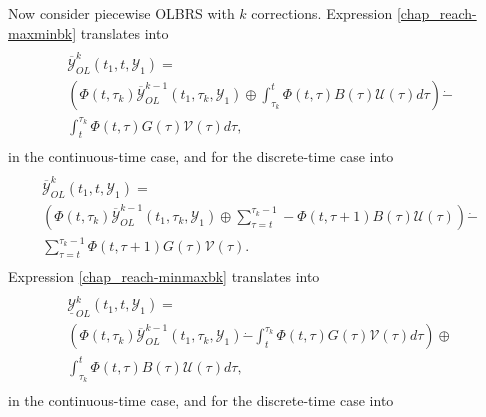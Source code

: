 \documentclass[letterpaper,10pt,english]{sphinxmanual}
\begin{document}
Now consider piecewise OLBRS with $k$ corrections. Expression
\eqref{chap_reach-maxminbk} translates into
\label{chap_reach:equation-ctlsmaxminbk}\begin{gather}
\begin{split}\begin{array}{l}
\overline{{\mathcal Y}}_{OL}^k(t_1, t, {\mathcal Y}_1) = \\
\left(\Phi(t, \tau_k)\overline{{\mathcal Y}}_{OL}^{k-1}(t_1, \tau_k, {\mathcal Y}_1) \oplus
\int_{\tau_k}^t\Phi(t, \tau)B(\tau){\mathcal U}(\tau)d\tau\right) \dot{-} \\
\int^{\tau_k}_t\Phi(t, \tau)G(\tau){\mathcal V}(\tau)d\tau,
\end{array}\end{split}\label{chap_reach-ctlsmaxminbk}
\end{gather}
in the continuous-time case, and for the discrete-time case into
\label{chap_reach:equation-dtlsmaxminbk}\begin{gather}
\begin{split}\begin{array}{l}
\overline{{\mathcal Y}}_{OL}^k(t_1, t, {\mathcal Y}_1) = \\
\left(\Phi(t, \tau_k)\overline{{\mathcal Y}}_{OL}^{k-1}(t_1, \tau_k, {\mathcal Y}_1) \oplus
\sum_{\tau=t}^{\tau_k-1}-\Phi(t, \tau+1)B(\tau){\mathcal U}(\tau)\right) \dot{-} \\
\sum_{\tau=t}^{\tau_k-1}\Phi(t, \tau+1)G(\tau){\mathcal V}(\tau).
\end{array}\end{split}\label{chap_reach-dtlsmaxminbk}
\end{gather}
Expression \eqref{chap_reach-minmaxbk} translates into
\label{chap_reach:equation-ctlsminmaxbk}\begin{gather}
\begin{split}\begin{array}{l}
\underline{{\mathcal Y}}_{OL}^k(t_1, t, {\mathcal Y}_1) = \\
\left(\Phi(t, \tau_k)\overline{{\mathcal Y}}_{OL}^{k-1}(t_1, \tau_k, {\mathcal Y}_1) \dot{-}
\int^{\tau_k}_t\Phi(t, \tau)G(\tau){\mathcal V}(\tau)d\tau\right)
\oplus \\
\int_{\tau_k}^t\Phi(t, \tau)B(\tau){\mathcal U}(\tau)d\tau,
\end{array}\end{split}\label{chap_reach-ctlsminmaxbk}
\end{gather}
in the continuous-time case, and for the discrete-time case into
\end{document}
